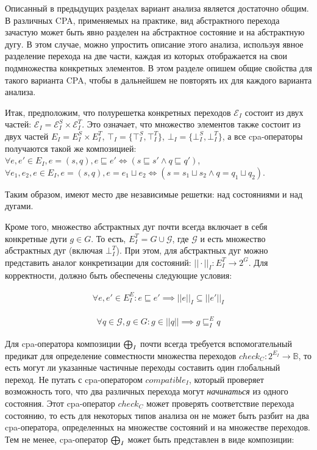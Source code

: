 Описанный в предыдущих разделах вариант анализа является достаточно общим. 
В различных CPA, применяемых на практике, вид абстрактного перехода зачастую может быть явно разделен на абстрактное состояние и на абстрактную дугу.
В этом случае, можно упростить описание этого анализа, используя явное разделение перехода на две части, каждая из которых отображается на свои подмножества конкретных элементов.
В этом разделе опишем общие свойства для такого варианта CPA, чтобы в дальнейшем не повторять их для каждого варианта анализа.

Итак, предположим, что полурешетка конкретных переходов $\mathcal{E}_I$ состоит из двух частей: $\mathcal{E}_I = \mathcal{E}^S_I \times \mathcal{E}^T_I$.
Это означает, что множество элементов также состоит из двух частей $E_I = E^S_I \times E^T_I$, $\top_I = \{\top^S_I, \top^T_I\}$, $\bot_I = \{\bot^S_I, \bot^T_I\}$, а все cpa-операторы получаются такой же композицией:\\
$\forall e, e' \in E_I, e = (s, q), e \sqsubseteq e' \iff (s \sqsubseteq s' \land q \sqsubseteq q')$, \\
$\forall e_1, e_2, e \in E_I, e = (s, q), e = e_1 \sqcup e_2 \iff (s = s_1 \sqcup s_2 \land q = q_1 \sqcup q_2)$.

Таким образом, имеют место две независимые решетки: над состояниями и над дугами.

Кроме того, множество абстрактных дуг почти всегда включает в себя конкретные дуги $g \in G$. 
То есть, $E^T_I = G \cup \mathcal{G}$, где $\mathcal{G}$ и есть множество абстрактных дуг (включая $\bot^T_I$).
При этом, для абстрактных дуг можно представить аналог конкретизации для состояний: $||\cdot||_I : E^T_I \to 2^G$.
Для корректности, должно быть обеспечены следующие условия:

\begin{equation}
\label{conc_edge_eq_1}
\begin{aligned}
\forall e, e' \in E^E_I: e \sqsubseteq e' \implies ||e||_I \subseteq ||e'||_I
\end{aligned}
\end{equation}

\begin{equation}
\label{conc_edge_eq_2}
\begin{aligned}
\forall q \in \mathcal{G}, g \in G: g \in ||q|| \implies g \sqsubseteq^E_I q
\end{aligned}
\end{equation}


Для cpa-оператора композиции $\mathrel{\bigoplus}_I$ почти всегда требуется вспомогательный предикат для определение совместности множества переходов $check_C: 2^{E_I} \to \mathbb{B}$, то есть могут ли указанные частичные переходы составить один глобальный переход.
Не путать с cpa-оператором $compatible_I$, который проверяет возможность того, что два различных перехода могут \textit{начинаться} из одного состояния.
Этот cpa-оператор $check_C$ может проверять соответствие перехода состоянию, то есть для некоторых типов анализа он не может быть разбит на два cpa-оператора, определенных на множестве состояний и на множестве переходов.
Тем не менее, cpa-оператор $\mathrel{\bigoplus}_I$ может быть представлен в виде композиции:

